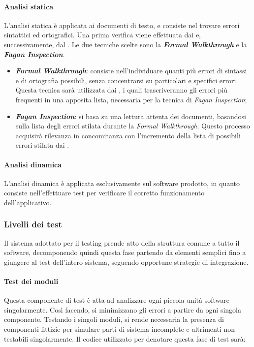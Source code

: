 			\paragraph{Analisi statica}
			L'analisi statica è applicata ai documenti di testo, e consiste nel trovare errori sintattici ed ortografici. Una prima verifica viene effettuata dai \textit{\Vers} e, successivamente, dal \textit{\RdP}. Le due tecniche scelte sono la \textbf{\textit{Formal Walkthrough}} e la \textbf{\textit{Fagan Inspection}}.
			\begin{itemize}
				\item \textbf{\textit{Formal Walkthrough}}: consiste nell'individuare quanti più errori di sintassi e di ortografia possibili, senza concentrarsi su particolari e specifici errori. Questa tecnica sarà utilizzata dai \textit{\Vers}, i quali trascriveranno gli errori più frequenti in una apposita lista, necessaria per la tecnica di \textit{Fagan Inspection};
				\item \textbf{\textit{Fagan Inspection}}: si basa su una lettura attenta dei documenti, basandosi sulla lista degli errori stilata durante la \textit{Formal Walkthrough}. Questo processo acquisirà rilevanza in concomitanza con l'incremento della lista di possibili errori stilata dai \textit{\Vers}.
			\end{itemize}

			\paragraph{Analisi dinamica}
			L'analisi dinamica è applicata esclusivamente sul software prodotto, in quanto consiste nell'effettuare test per verificare il corretto funzionamento dell'applicativo.
	
			
		\subsubsection{Livelli dei test}
		Il sistema adottato per il testing prende atto della struttura comune a tutto il software, decomponendo quindi questa fase partendo da elementi semplici fino a giungere al test dell'intero sistema, seguendo opportune strategie di integrazione.
		
		\paragraph{Test dei moduli}
		Questa componente di test è atta ad analizzare ogni piccola unità software singolarmente. Così facendo, si minimizzano gli errori a partire da ogni singola componente. Testando i singoli moduli, si rende necessaria la presenza di componenti fittizie per simulare parti di sistema incomplete e altrimenti non testabili singolarmente. Il codice utilizzato per denotare questa fase di test sarà:
		
